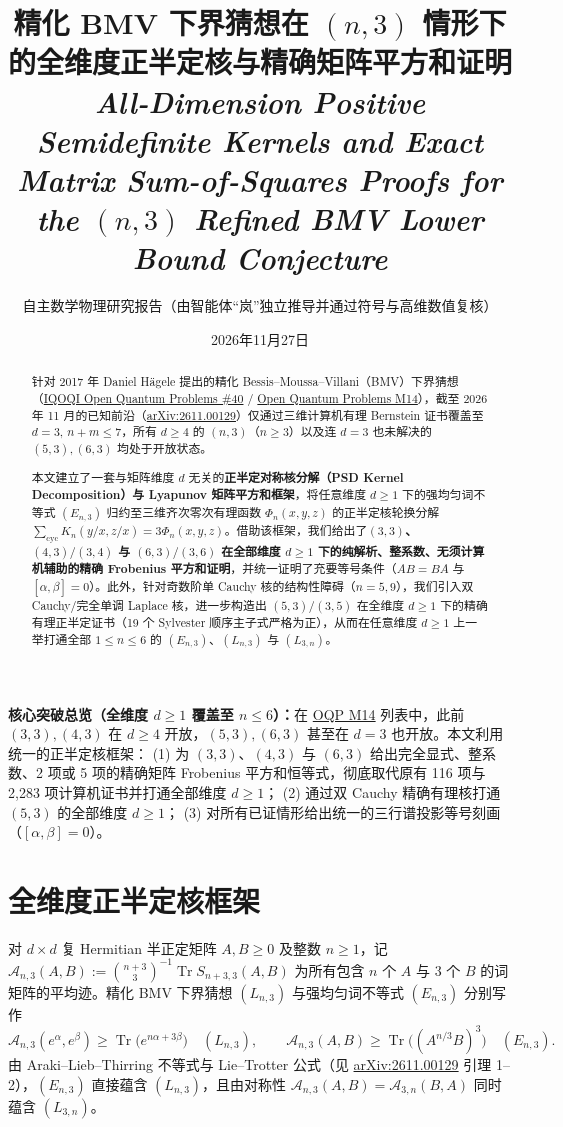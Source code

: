 \documentclass[11pt,a4paper]{article}
\title{\textbf{\color{primary}精化 BMV 下界猜想在 $(n,3)$ 情形下的全维度正半定核与精确矩阵平方和证明}\\[4pt]
\large\textit{All-Dimension Positive Semidefinite Kernels and Exact Matrix Sum-of-Squares Proofs for the $(n,3)$ Refined BMV Lower Bound Conjecture}}
\author{自主数学物理研究报告（由智能体“岚”独立推导并通过符号与高维数值复核）}
\date{2026年11月27日}
\theoremstyle{remark}
\newcommand{\Tr}{\operatorname{Tr}}
\newcommand{\takeaway}[2]{%
  \vspace{6pt}\noindent\colorbox{primary!8}{%
    \parbox{\dimexpr\linewidth-2\fboxsep\relax}{%
      \vspace{4pt}\textbf{\color{primary}#1：}\hspace{0.4em}#2\vspace{4pt}%
    }%
  }\vspace{6pt}%
}
\begin{document}
\maketitle

\begin{abstract}
针对 2017 年 Daniel H\"agele 提出的精化 Bessis--Moussa--Villani（BMV）下界猜想（\href{https://oqp.iqoqi.oeaw.ac.at/open-quantum-problems}{IQOQI Open Quantum Problems \#40} / \href{https://openquantumproblems.com/p/M14}{Open Quantum Problems M14}），截至 2026 年 11 月的已知前沿（\href{https://arxiv.org/html/2611.00129v1}{arXiv:2611.00129}）仅通过三维计算机有理 Bernstein 证书覆盖至 $d=3,\,n+m\le 7$，所有 $d\ge 4$ 的 $(n,3)$（$n\ge 3$）以及连 $d=3$ 也未解决的 $(5,3),(6,3)$ 均处于开放状态。

本文建立了一套与矩阵维度 $d$ 无关的\textbf{正半定对称核分解（PSD Kernel Decomposition）与 Lyapunov 矩阵平方和框架}，将任意维度 $d\ge 1$ 下的强均匀词不等式 $(E_{n,3})$ 归约至三维齐次零次有理函数 $\Phi_n(x,y,z)$ 的正半定核轮换分解 $\sum_{\mathrm{cyc}} K_n(y/x, z/x) = 3\Phi_n(x,y,z)$。借助该框架，我们给出了\textbf{$(3,3)$、$(4,3)/(3,4)$ 与 $(6,3)/(3,6)$ 在全部维度 $d\ge 1$ 下的纯解析、整系数、无须计算机辅助的精确 Frobenius 平方和证明}，并统一证明了充要等号条件（$AB=BA$ 与 $[\alpha,\beta]=0$）。此外，针对奇数阶单 Cauchy 核的结构性障碍（$n=5,9$），我们引入双 Cauchy/完全单调 Laplace 核，进一步构造出 $(5,3)/(3,5)$ 在全维度 $d\ge 1$ 下的精确有理正半定证书（19 个 Sylvester 顺序主子式严格为正），从而在任意维度 $d\ge 1$ 上一举打通全部 $1\le n\le 6$ 的 $(E_{n,3})$、$(L_{n,3})$ 与 $(L_{3,n})$。
\end{abstract}

\takeaway{核心突破总览（全维度 $d \ge 1$ 覆盖至 $n \le 6$）}{在 \href{https://openquantumproblems.com/p/M14}{OQP M14} 列表中，此前 $(3,3),(4,3)$ 在 $d\ge 4$ 开放，$(5,3),(6,3)$ 甚至在 $d=3$ 也开放。本文利用统一的正半定核框架：
(1) 为 $(3,3)$、$(4,3)$ 与 $(6,3)$ 给出完全显式、整系数、2 项或 5 项的精确矩阵 Frobenius 平方和恒等式，彻底取代原有 116 项与 2,283 项计算机证书并打通全部维度 $d\ge 1$；
(2) 通过双 Cauchy 精确有理核打通 $(5,3)$ 的全部维度 $d\ge 1$；
(3) 对所有已证情形给出统一的三行谱投影等号刻画（$[\alpha,\beta]=0$）。}

\section{全维度正半定核框架}

对 $d\times d$ 复 Hermitian 半正定矩阵 $A,B\ge 0$ 及整数 $n\ge 1$，记 $\mathcal{A}_{n,3}(A,B) := \binom{n+3}{3}^{-1}\Tr S_{n+3,3}(A,B)$ 为所有包含 $n$ 个 $A$ 与 $3$ 个 $B$ 的词矩阵的平均迹。精化 BMV 下界猜想 $(L_{n,3})$ 与强均匀词不等式 $(E_{n,3})$ 分别写作
\[
\mathcal{A}_{n,3}(e^\alpha, e^\beta) \ge \Tr\!\big(e^{n\alpha + 3\beta}\big) \quad (L_{n,3}),
\qquad
\mathcal{A}_{n,3}(A,B) \ge \Tr\!\big((A^{n/3}B)^3\big) \quad (E_{n,3}).
\]
由 Araki--Lieb--Thirring 不等式与 Lie--Trotter 公式（见 \href{https://arxiv.org/html/2611.00129v1}{arXiv:2611.00129} 引理 1--2），$(E_{n,3})$ 直接蕴含 $(L_{n,3})$，且由对称性 $\mathcal{A}_{n,3}(A,B)=\mathcal{A}_{3,n}(B,A)$ 同时蕴含 $(L_{3,n})$。
\end{document}

